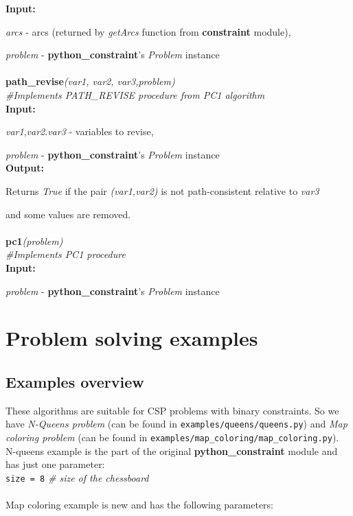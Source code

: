 \documentclass[a4paper]{article}
\begin{document}
\textbf{Input:}

\textit{arcs} - arcs (returned by \textit{getArcs} function from \textbf{constraint} module),

\textit{problem} - \textbf{python\_constraint}'s \textit{Problem} instance\\\\ 
\textbf{path\_revise}\textit{(var1, var2, var3,problem)}\\
\textit{\#Implements PATH\_REVISE procedure from PC1 algorithm}\\


\textbf{Input:}

\textit{var1},\textit{var2}.\textit{var3} - variables to revise,

\textit{problem} - \textbf{python\_constraint}'s \textit{Problem} instance\\


\textbf{Output:}

Returns \textit{True} if the pair \textit{(var1,var2)} is not path-consistent relative to \textit{var3}

and some values are removed.\\\\
\textbf{pc1}\textit{(problem)}\\
\textit{\#Implements PC1 procedure}\\


\textbf{Input:}

\textit{problem} - \textbf{python\_constraint}'s \textit{Problem} instance\\
 
\section{Problem solving examples}
\subsection{Examples overview}
These algorithms are suitable for CSP problems with binary constraints. So we have \textit{N-Queens problem} (can be found in \texttt{examples/queens/queens.py}) and \textit{Map coloring problem} (can be found in \texttt{examples/map\_coloring/map\_coloring.py}).
N-queens example is the part of the original \textbf{python\_constraint} module and has just one parameter:\\

\texttt{size = 8} \textit{\# size of the chessboard}\\\\
Map coloring example is new and has the following parameters:\\
\end{document}
